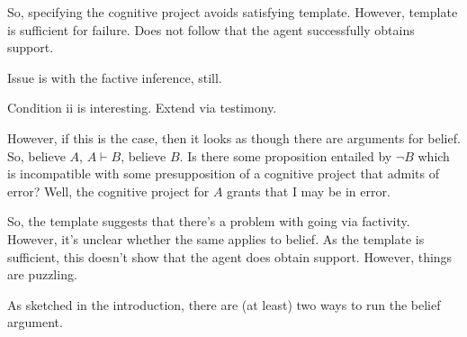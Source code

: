 \documentclass[10pt]{article}
\newcommand{\hozline}[0]{%
  \noindent\hdashrule[0.5ex][c]{\textwidth}{.1pt}{}
}
\begin{document}
\begin{note}
  So, specifying the cognitive project avoids satisfying template.
  However, template is sufficient for failure.
  Does not follow that the agent successfully obtains support.

  Issue is with the factive inference, still.
\end{note}


\hozline


\begin{note}
  Condition ii is interesting.
  Extend via testimony.

  However, if this is the case, then it looks as though there are arguments for belief.
  So, believe \(A\), \(A \vdash B\), believe \(B\).
  Is there some proposition entailed by \(\lnot B\) which is incompatible with some presupposition of a cognitive project that admits of error?
  Well, the cognitive project for \(A\) grants that I may be in error.

  So, the template suggests that there's a problem with going via factivity.
  However, it's unclear whether the same applies to belief.
  As the template is sufficient, this doesn't show that the agent does obtain support.
  However, things are puzzling.

  As sketched in the introduction, there are (at least) two ways to run the belief argument.
\end{note}
\end{document}
